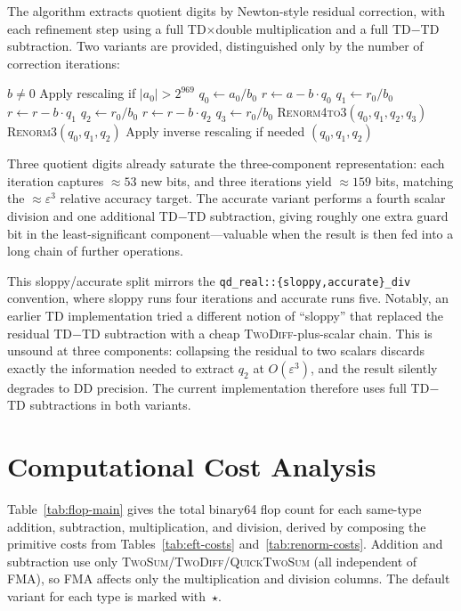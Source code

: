 \documentclass[11pt,a4paper]{article}
\begin{document}
The algorithm extracts quotient digits by Newton-style residual
correction, with each refinement step using a full TD$\times$double
multiplication and a full TD$-$TD subtraction.  Two variants are
provided, distinguished only by the number of correction iterations:
\begin{algorithmic}[1]
\Require $b \ne 0$
\State Apply rescaling if $|a_0| > 2^{969}$
\State $q_0 \gets a_0 / b_0$
\State $r \gets a - b \cdot q_0$ 
\State $q_1 \gets r_0 / b_0$
\State $r \gets r - b \cdot q_1$
\State $q_2 \gets r_0 / b_0$
  \State $r \gets r - b \cdot q_2$
  \State $q_3 \gets r_0 / b_0$
  \State \textsc{Renorm4to3}$(q_0, q_1, q_2, q_3)$
\Else
  \State \textsc{Renorm3}$(q_0, q_1, q_2)$
\EndIf
\State Apply inverse rescaling if needed
\State \Return $(q_0, q_1, q_2)$
\end{algorithmic}
Three quotient digits already saturate the three-component
representation: each iteration captures $\approx 53$ new bits, and
three iterations yield $\approx 159$ bits, matching the
$\approx \varepsilon^3$ relative accuracy target.  The accurate
variant performs a fourth scalar division and one additional
TD$-$TD subtraction, giving roughly one extra guard bit in the
least-significant component---valuable when the result is then fed
into a long chain of further operations.

This sloppy/accurate split mirrors the
\texttt{qd\_real::\{sloppy,accurate\}\_div} convention, where sloppy
runs four iterations and accurate runs five.  Notably, an earlier
TD implementation tried a different notion of ``sloppy'' that
replaced the residual TD$-$TD subtraction with a cheap
\textsc{TwoDiff}-plus-scalar chain.  This is unsound at three
components: collapsing the residual to two scalars discards exactly
the information needed to extract $q_2$ at $O(\varepsilon^3)$, and
the result silently degrades to DD precision.  The current
implementation therefore uses full TD$-$TD subtractions in both
variants.


\section{Computational Cost Analysis}
\label{sec:cost}

Table~\ref{tab:flop-main} gives the total binary64 flop count for
each same-type addition, subtraction, multiplication, and division,
derived by composing the primitive costs from
Tables~\ref{tab:eft-costs} and~\ref{tab:renorm-costs}.
Addition and subtraction use only
\textsc{TwoSum}/\textsc{TwoDiff}/\textsc{QuickTwoSum}
(all independent of FMA), so FMA affects only the multiplication
and division columns.
The default variant for each type is marked with~$\star$.
\end{document}
